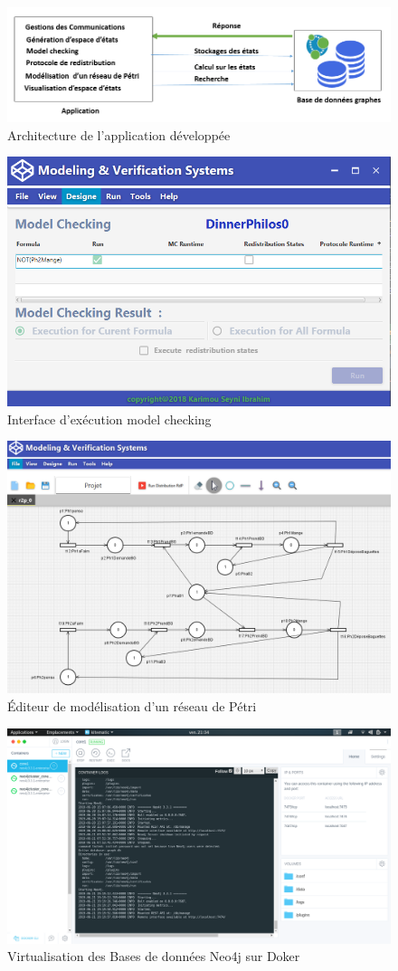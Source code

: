 \begin{figure} [h]
	\centering
	\includegraphics[width=0.7\linewidth]{img/architecture}
	\caption{Architecture de l'application développée}
	\label{fig:architecture}
\end{figure}
\begin{figure} [h]
	\centering
	\includegraphics[width=0.7\linewidth]{img/mcapp}
	\caption{Interface d'exécution model checking}
	\label{fig:mc}
\end{figure}
\begin{figure}  
	\centering
	\includegraphics[width=0.7\linewidth]{img/apppetrinet}
	\caption{Éditeur de modélisation d'un réseau de Pétri} \label{apppetrinet}
	\label{fig:apppetrinet}
\end{figure}
\begin{figure} 
	\centering
	\includegraphics[width=0.7\linewidth]{img/clusterdocker}
	\caption{Virtualisation des Bases de données Neo4j sur Doker}
	\label{fig:clusterdocker}
\end{figure}
